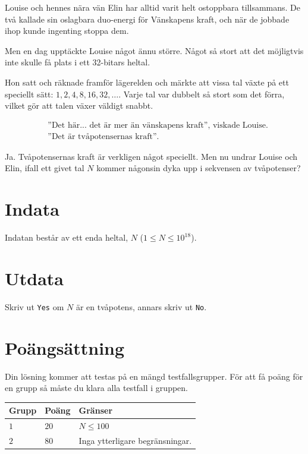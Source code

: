 
Louise och hennes nära vän Elin har alltid varit helt ostoppbara tillsammans.
De två kallade sin oslagbara duo-energi för Vänskapens kraft, och när de jobbade ihop kunde ingenting stoppa dem.

Men en dag upptäckte Louise något ännu större. Något så stort att det möjligtvis inte skulle få plats i ett 32-bitars heltal.

Hon satt och räknade framför lägerelden och märkte att vissa tal växte på ett speciellt sätt: $1, 2, 4, 8, 16, 32, \dots$.  
Varje tal var dubbelt så stort som det förra, vilket gör att talen växer väldigt snabbt.

\begin{align*}
& \text{''Det här... det är mer än vänskapens kraft'', viskade Louise.} \\
& \text{''Det är tvåpotensernas kraft''.}
\end{align*}

Ja. Tvåpotensernas kraft är verkligen något speciellt. Men nu undrar Louise och Elin, ifall ett givet tal $N$ kommer någonsin dyka upp i sekvensen av tvåpotenser?

\section*{Indata}
Indatan består av ett enda heltal, $N$ ($1 \leq N \leq 10^{18}$).

\section*{Utdata}
Skriv ut \verb|Yes| om $N$ är en tvåpotens, annars skriv ut \verb|No|.


\section*{Poängsättning}
Din lösning kommer att testas på en mängd testfallsgrupper.
För att få poäng för en grupp så måste du klara alla testfall i gruppen.

\noindent
\begin{tabular}{| l | l | p{12cm} |}
  \hline
  \textbf{Grupp} & \textbf{Poäng} & \textbf{Gränser} \\ \hline
  $1$    & $20$  & $N \le 100$ \\ \hline
  $2$    & $80$  & Inga ytterligare begränsningar. \\ \hline
\end{tabular}

